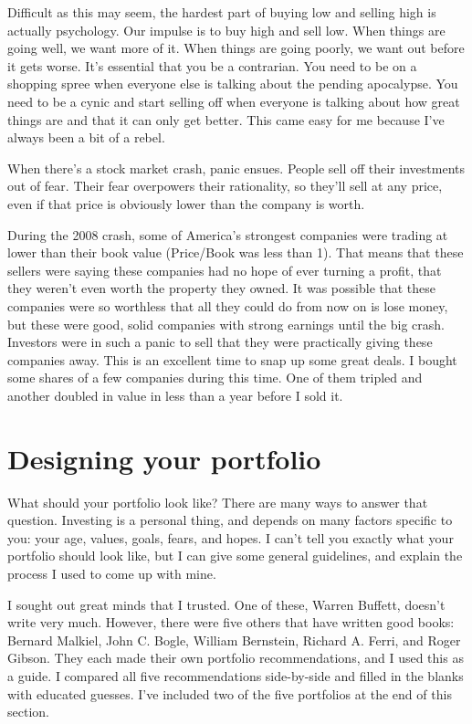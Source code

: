 Difficult as this may seem, the hardest part of buying low and selling high is actually psychology. Our impulse is to buy high and sell low. When things are going well, we want more of it. When things are going poorly, we want out before it gets worse. It's essential that you be a contrarian. You need to be on a shopping spree when everyone else is talking about the pending apocalypse. You need to be a cynic and start selling off when everyone is talking about how great things are and that it can only get better. This came easy for me because I've always been a bit of a rebel.

When there's a stock market crash, panic ensues. People sell off their investments out of fear. Their fear overpowers their rationality, so they'll sell at any price, even if that price is obviously lower than the company is worth.

During the 2008 crash, some of America's strongest companies were trading at lower than their book value (Price/Book was less than 1). That means that these sellers were saying these companies had no hope of ever turning a profit, that they weren't even worth the property they owned. It was possible that these companies were so worthless that all they could do from now on is lose money, but these were good, solid companies with strong earnings until the big crash. Investors were in such a panic to sell that they were practically giving these companies away. This is an excellent time to snap up some great deals. I bought some shares of a few companies during this time. One of them tripled and another doubled in value in less than a year before I sold it.

\section{Designing your portfolio}
What should your portfolio look like? There are many ways to answer that question. Investing is a personal thing, and depends on many factors specific to you: your age, values, goals, fears, and hopes. I can't tell you exactly what your portfolio should look like, but I can give some general guidelines, and explain the process I used to come up with mine.

I sought out great minds that I trusted. One of these, Warren Buffett, doesn't write very much. However, there were five others that have written good books: Bernard Malkiel, John C. Bogle, William Bernstein, Richard A. Ferri, and Roger Gibson. They each made their own portfolio recommendations, and I used this as a guide. I compared all five recommendations side-by-side and filled in the blanks with educated guesses. I've included two of the five portfolios at the end of this section.

